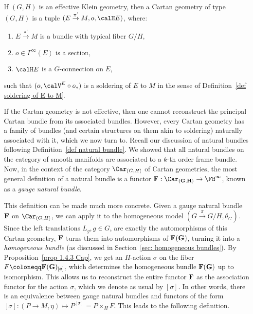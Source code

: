 \begin{defn}
    If $(G,H)$ is an effective Klein geometry, then a Cartan geometry of type $(G,H)$ is a tuple $(E\overset{\pi'}{\to}M,o,\calH E)$, where: 
    \begin{enumerate}
        \item $E\overset{\pi'}{\to}M$ is a bundle with typical fiber $G\slash H$, 
        \item $o\in\Gamma^\infty(E)$ is a section,
        \item $\calH E$ is a $G$-connection on $E$,
    \end{enumerate}
    such that $(o,\calV^E\circ o_\ast)$ is a soldering of $E$ to $M$ in the sense of Definition~\ref{def soldering of E to M}.
\end{defn}

If the Cartan geometry is not effective, then one cannot reconstruct the principal Cartan bundle from its associated bundles. However, every Cartan geometry has a family of bundles (and certain structures on them akin to soldering) naturally associated with it, which we now turn to. Recall our discussion of natural bundles following Definition~\ref{def natural bundle}. We showed that all natural bundles on the category of smooth manifolds are associated to a $k$-th order frame bundle. Now, in the context of the category $\Car_{(G,H)}$ of Cartan geometries, the most general definition of a natural bundle is a functor $\bf{F}:\Car_{(G,H)}\to \FB^\infty$, known as a \emph{gauge natural bundle}. 

This definition can be made much more concrete. Given a gauge natural bundle $\bf{F}$ on $\Car_{(G,H)}$, we can apply it to the homogeneous model $(G\overset{\pi}{\to} G\slash H,\theta_G)$. Since the left translations $L_g,g\in G$, are exactly the automorphisms of this Cartan geometry, $\bf{F}$ turns them into automorphisms of $\bf{F}(G)$, turning it into a \emph{homogeneous bundle} (as discussed in Section~\ref{sec: homogeneous bundles}). By Proposition~\ref{prop 1.4.3 Cap}, we get an $H$-action $\sigma$ on the fiber $F\coloneqq \bf{F}(G)_{[e]}$, which determines the homogeneous bundle $\bf{F}(G)$ up to isomorphism. This allows us to reconstruct the entire functor $\bf{F}$ as the association functor for the action $\sigma$, which we denote as usual by $[\sigma]$. In other words, there is an equivalence between gauge natural bundles and functors of the form $[\sigma]:(P\to M,\eta)\mapsto P^{[\sigma]}=P\times_H F$. This leads to the following definition.

